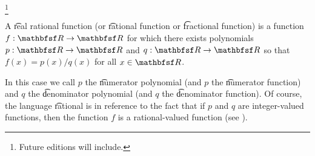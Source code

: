 
\footnote{Future editions will include.}


A \t{real rational function} (or \t{rational function} or \t{fractional function}) is a function $f: \R \to \R$ for which there exists polynomials $p: \R \to \R$ and $q: \R \to \R$ so that $f(x) = p(x) / q(x)$ for all $x \in \R$.

In this case we call $p$ the \t{numerator polynomial} (and $p$ the \t{numerator function}) and $q$ the \t{denominator polynomial} (and $q$ the \t{denominator function}).
Of course, the language \t{rational} is in reference to the fact that if $p$ and $q$ are integer-valued functions, then the function $f$ is a rational-valued function (see ).

\blankpage
